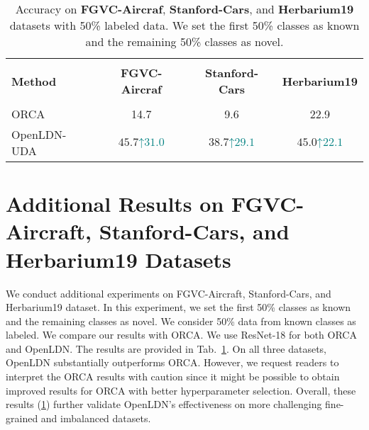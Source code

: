 \documentclass[runningheads]{eccv2022submission}
\begin{document}
\begin{table}[h]
\begin{center}\setlength{\tabcolsep}{2pt}
\small
\begin{tabular}{lccc}
\hline

\hline

\hline\\[-3mm]
\textbf{Method}  & \textbf{FGVC-Aircraf} & \textbf{Stanford-Cars} & \textbf{Herbarium19}\\
 [-3mm]
\\
 \hline

\hline

\hline
ORCA\cite{cao2022openworld} & 14.7 & 9.6 & 22.9 \\
\rowcolor[gray]{.95} {OpenLDN-UDA} & $\mathbf{45.7}${\tiny{\textcolor{teal}{$\mathord{\uparrow}31.0$}}} & $\mathbf{38.7}${\tiny{\textcolor{teal}{$\mathord{\uparrow}29.1$}}} & $\mathbf{45.0}${\tiny{\textcolor{teal}{$\mathord{\uparrow}22.1$}}}\\\hline 

\hline

\hline
\end{tabular}
\end{center}
\caption{Accuracy on \textbf{FGVC-Aircraf}, \textbf{Stanford-Cars}, and \textbf{Herbarium19} datasets with 50\% labeled data. We set the first 50\% classes as known and the remaining 50\% classes as novel.}
\label{tab:three_dataset}
\vspace{-10mm}
\end{table}



\section{Additional Results on FGVC-Aircraft, Stanford-Cars, and Herbarium19 Datasets}
\label{sec:three_dataset}

We conduct additional experiments on FGVC-Aircraft\cite{maji13fine-grained}, Stanford-Cars\cite{KrauseStarkDengFei-Fei_3DRR2013}, and Herbarium19 \cite{tan2019herbarium} dataset. In this experiment, we set the first 50\% classes as known and the remaining classes as novel. We consider 50\% data from known classes as labeled. We compare our results with ORCA. We use ResNet-18 for both ORCA and OpenLDN. The results are provided in Tab.~\ref{tab:three_dataset}. On all three datasets, OpenLDN substantially outperforms ORCA. However, we request readers to interpret the ORCA results with caution since it might be possible to obtain improved results for ORCA with better hyperparameter selection. Overall, these results (\ref{tab:three_dataset}) further validate OpenLDN’s effectiveness on more challenging fine-grained and imbalanced datasets.
\end{document}
